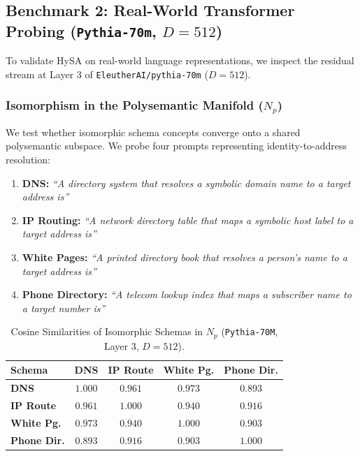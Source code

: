 \documentclass[11pt,a4paper]{article}
\theoremstyle{definition}
\begin{document}
\subsection{Benchmark 2: Real-World Transformer Probing (\texorpdfstring{\texttt{Pythia-70m}}{Pythia-70m}, \texorpdfstring{$D=512$}{D=512})}
To validate HySA on real-world language representations, we inspect the residual stream at Layer 3 of \texttt{EleutherAI/pythia-70m} ($D=512$).

\subsubsection{Isomorphism in the Polysemantic Manifold \texorpdfstring{($N_p$)}{(Np)}}
We test whether isomorphic schema concepts converge onto a shared polysemantic subspace. We probe four prompts representing identity-to-address resolution:
\begin{enumerate}[leftmargin=*, itemsep=1.0pt]
    \item \textbf{DNS:} \textit{``A directory system that resolves a symbolic domain name to a target address is''}
    \item \textbf{IP Routing:} \textit{``A network directory table that maps a symbolic host label to a target address is''}
    \item \textbf{White Pages:} \textit{``A printed directory book that resolves a person's name to a target address is''}
    \item \textbf{Phone Directory:} \textit{``A telecom lookup index that maps a subscriber name to a target number is''}
\end{enumerate}

\begin{table}[h]
\centering
\caption{Cosine Similarities of Isomorphic Schemas in $N_p$ (\texttt{Pythia-70M}, Layer 3, $D=512$).}
\label{tab:pythia_cosine}
\vspace{0.12cm}
\scriptsize
\setlength{\tabcolsep}{2.5pt}
\begin{tabular}{@{}lcccc@{}}
\toprule
\textbf{Schema} & \textbf{DNS} & \textbf{IP Route} & \textbf{White Pg.} & \textbf{Phone Dir.} \\ \midrule
\textbf{DNS} & $1.000$ & $0.961$ & $0.973$ & $0.893$ \\
\textbf{IP Route} & $0.961$ & $1.000$ & $0.940$ & $0.916$ \\
\textbf{White Pg.} & $0.973$ & $0.940$ & $1.000$ & $0.903$ \\
\textbf{Phone Dir.} & $0.893$ & $0.916$ & $0.903$ & $1.000$ \\ \bottomrule
\end{tabular}
\end{table}
\end{document}
